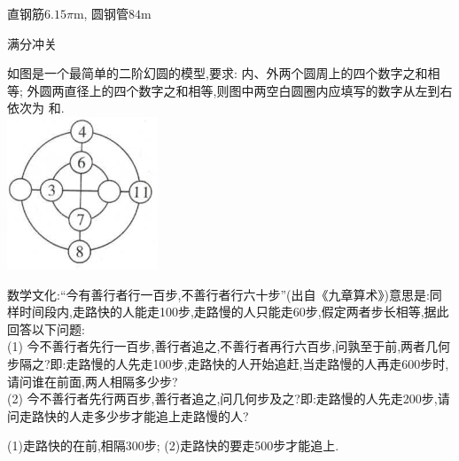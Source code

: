 \documentclass[cn,blue,12pt]{elegantbook}
\renewcommand \tkt[1]{{\CJKunderline[hidden=true, skip=true, thickness=1pt]{#1}}}
\begin{document}
\begin{shiti}
\begin{shiti}[resume]
\begin{solution}
    直钢筋\(6.15\pi \)m, 圆钢管\(84\)m
\end{solution}
\end{shiti}
\item 满分冲关
    \begin{shiti}[resume]
    \item 如图是一个最简单的二阶幻圆的模型,要求: 内、外两个圆周上的四个数字之和相等; 外圆两直径上的四个数字之和相等,则图中两空白圆圈内应填写的数字从左到右依次为 \tkt{2}和\tkt{9}.\\
\includegraphics[width=0.2\linewidth]{pic/20200531010.png}
    \item 数学文化:``今有善行者行一百步,不善行者行六十步''(出自《九章算术》)意思是:同样时间段内,走路快的人能走100步,走路慢的人只能走60步,假定两者步长相等,据此回答以下问题:\\
(1) 今不善行者先行一百步,善行者追之,不善行者再行六百步,问孰至于前,两者几何步隔之?即:走路慢的人先走100步,走路快的人开始追赶,当走路慢的人再走600步时,请问谁在前面,两人相隔多少步?\\
(2) 今不善行者先行两百步,善行者追之,问几何步及之?即:走路慢的人先走200步,请问走路快的人走多少步才能追上走路慢的人?
\begin{solution}
    (1)走路快的在前,相隔300步; (2)走路快的要走500步才能追上.
\end{solution}
\end{shiti}
\end{shiti}
\end{document}
